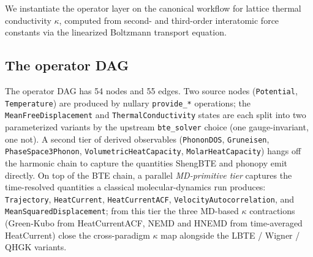 \documentclass[11pt,a4paper]{article}
\begin{document}
We instantiate the operator layer on the canonical workflow for lattice thermal conductivity $\kappa$,
computed from second- and third-order interatomic force constants via the linearized Boltzmann
transport equation.

\subsection{The operator DAG}

The operator DAG has 54 nodes and 55 edges. Two source nodes (\texttt{Potential},
\texttt{Temperature}) are produced by nullary \texttt{provide\_*} operations; the
\texttt{MeanFreeDisplacement} and \texttt{ThermalConductivity} states are each split
into two parameterized variants by the upstream \texttt{bte\_solver} choice (one
gauge-invariant, one not). A second tier of derived observables
(\texttt{PhononDOS}, \texttt{Gruneisen}, \texttt{PhaseSpace3Phonon},
\texttt{VolumetricHeatCapacity}, \texttt{MolarHeatCapacity}) hangs off the
harmonic chain to capture the quantities ShengBTE and phonopy emit directly.
On top of the BTE chain, a parallel \emph{MD-primitive tier} captures the
time-resolved quantities a classical molecular-dynamics run produces:
\texttt{Trajectory}, \texttt{HeatCurrent}, \texttt{HeatCurrentACF},
\texttt{VelocityAutocorrelation}, and \texttt{MeanSquaredDisplacement}; from this
tier the three MD-based $\kappa$ contractions (Green-Kubo from HeatCurrentACF,
NEMD and HNEMD from time-averaged HeatCurrent) close the cross-paradigm
$\kappa$ map alongside the LBTE / Wigner / QHGK variants.
\end{document}
